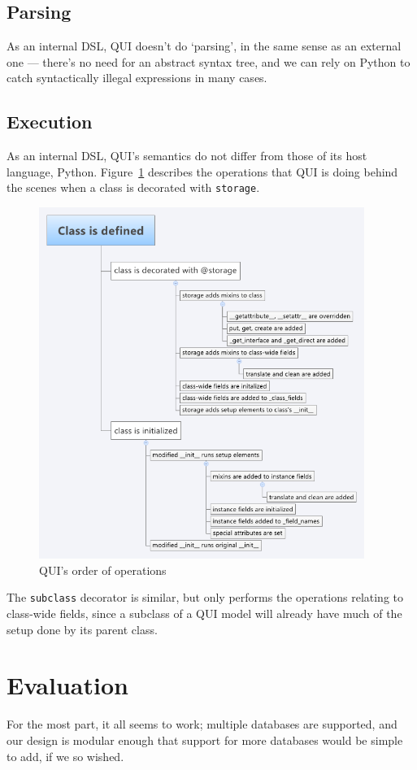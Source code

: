 \documentclass{article} %
\newcommand{\il}[1]{\lstinline{#1}}
\begin{document}
\subsection{Parsing}
As an internal DSL, QUI doesn't do `parsing', in the same sense as an external one --- there's no need for an abstract syntax tree, and we can rely on Python to catch syntactically 
illegal expressions in many cases.
\subsection{Execution}
As an internal DSL, QUI's semantics do not differ from those of its host language, Python. Figure~\ref{fig:classdef} describes the operations that QUI is doing behind the scenes when
a class is decorated with \il{storage}.
\begin{figure}[htb]
\centering
\includegraphics[width=400px]{ClassDefTimeline}
\caption{QUI's order of operations}
\label{fig:classdef}
\end{figure}

The \il{subclass} decorator is similar, but only performs the operations relating to class-wide fields, since a subclass of a QUI model will already have much of the setup done by its parent class. 
\section{Evaluation}
For the most part, it all seems to work; multiple databases are supported, and our design is modular enough that support for more databases would be simple to add, if we so wished. 
\end{document}
